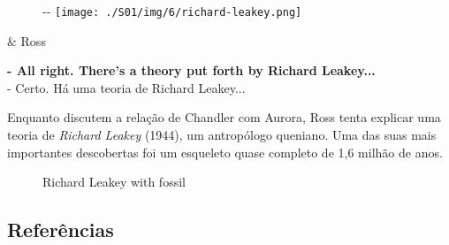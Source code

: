 \begin{figure}[!ht]
  \begin{adjustwidth}{-\oddsidemargin-1in}{-\rightmargin}
    \centering
    \texttt{[image: ./S01/img/6/richard-leakey.png]}
  \end{adjustwidth}
\end{figure}

\begin{tcolorbox}[enhanced,center upper,
    drop fuzzy shadow southeast, boxrule=0.3pt,
    lower separated=false,
    colframe=black!30!dialogoBorder,colback=white]
\begin{minipage}[c]{0.16\linewidth}
   & \centering \scriptsize{Ross}
\end{minipage}
\hfill
\begin{minipage}[c]{0.8\linewidth}
  \textbf{- All right. There's a theory put forth by Richard Leakey...}\\
  - Certo. Há uma teoria de Richard Leakey...
\end{minipage}
\end{tcolorbox}

Enquanto discutem a relação de Chandler com Aurora, Ross tenta explicar
uma teoria de \emph{Richard Leakey} (1944), um antropólogo queniano. Uma
das suas mais importantes descobertas foi um esqueleto quase completo de
1,6 milhão de anos.

\begin{figure}
  \centering
    \caption{Richard Leakey with fossil\label{fig:richard-leakey-with-fossil}}
\end{figure}

\hypertarget{referuxeancias-1}{%
\subsection{Referências}\label{referuxeancias-1}}

